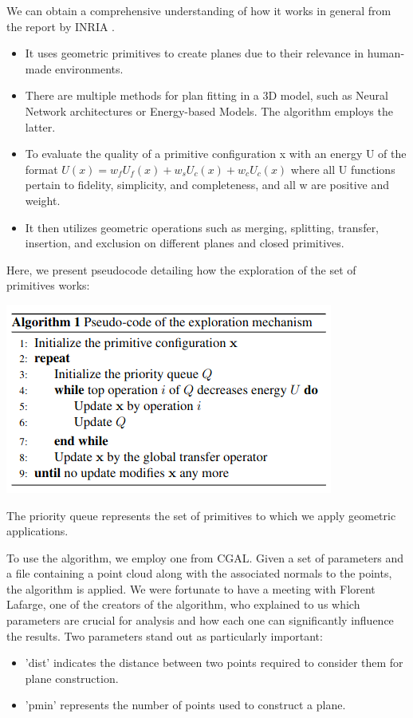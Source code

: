 \documentclass{article}
\begin{document}
We can obtain a comprehensive understanding of how it works in general from the report by INRIA \cite{yu:hal-03621896}.

\begin{itemize}
\item It uses geometric primitives to create planes due to their relevance in human-made environments.
\item There are multiple methods for plan fitting in a 3D model, such as Neural Network architectures or Energy-based Models. The algorithm employs the latter.
\item To evaluate the quality of a primitive configuration x with an energy U of the format
  \newline 
  $ U(x) = w_f U_f(x) + w_s U_c(x) + w_c U_c(x)$
  \newline
  where all U functions pertain to fidelity, simplicity, and completeness, and all w are positive and weight.
  \item It then utilizes geometric operations such as merging, splitting, transfer, insertion, and exclusion on different planes and closed primitives.
\end{itemize}
  Here, we present pseudocode detailing how the exploration of the set of primitives works:
\begin{center}
  \includegraphics[scale =  0.5]{../../images/Pseudo_code_exploration.png}
\end{center}
The priority queue represents the set of primitives to which we apply geometric applications.

To use the algorithm, we employ one from CGAL. Given a set of parameters and a file containing a point cloud along with the associated normals to the points,
the algorithm is applied. We were fortunate to have a meeting with Florent Lafarge, one of the creators of the algorithm,
who explained to us which parameters are crucial for analysis and how each one can significantly influence the results.
Two parameters stand out as particularly important: 
\begin{itemize}
  \item 'dist' indicates the distance between two points required to consider them for plane construction.
  \item 'pmin' represents the number of points used to construct a plane.
\end{itemize}
\end{document}
